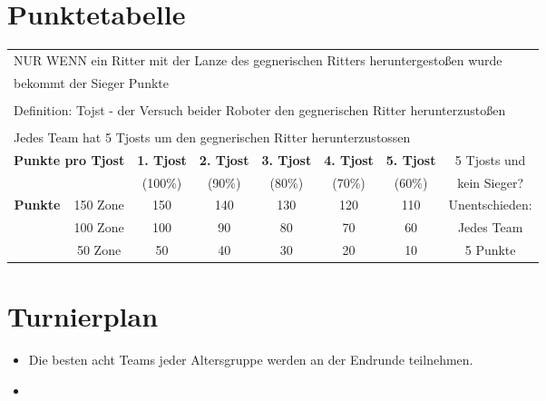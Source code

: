 \documentclass[a4paper,12pt]{article}
\begin{document}
\section{Punktetabelle}
\begin{center}
\begin{tabular}{|c|c|c|c|c|c|c|c|} \hline
	\multicolumn{8}{|l|}{NUR WENN ein Ritter mit der Lanze des gegnerischen Ritters heruntergestoßen wurde}\\
	\multicolumn{8}{|l|}{bekommt der Sieger Punkte}\\
	\multicolumn{8}{|l|}{}\\
	\multicolumn{8}{|l|}{Definition: Tojst - der Versuch beider Roboter den gegnerischen Ritter herunterzustoßen}\\
	\multicolumn{8}{|l|}{}\\
	\multicolumn{8}{|l|}{Jedes Team hat 5 Tjosts um den gegnerischen Ritter herunterzustossen} \\ \hline
	\multicolumn{2}{|c|}{\multirow{2}{*}{\textbf{Punkte pro Tjost}}} & \textbf{1. Tjost} & \textbf{2. Tjost} & \textbf{3. Tjost} & \textbf{4. Tjost} & \textbf{5. Tjost} & 5 Tjosts und \\
	\multicolumn{2}{|c|}{}  & (100\%) & (90\%) & (80\%) & (70\%) & (60\%) & kein Sieger? \\
	\cline{1-7}
	\multirow{3}{*}{\textbf{Punkte}} & 150 Zone & 150 & 140 & 130 & 120 & 110 & Unentschieden: \\
	\cline{2-7}
	& 100 Zone & 100 & 90 & 80 & 70 & 60 & Jedes Team \\
	\cline{2-7}
	& 50  Zone& 50 & 40 & 30 & 20 & 10 & 5 Punkte \\
	\hline
\end{tabular}
\end{center}

\pagebreak
\section{Turnierplan}
\begin{itemize}
	\item Die besten acht Teams jeder Altersgruppe werden an der Endrunde
		teilnehmen.
        \item \tournamentQualification
\end{itemize}
\tournamentScoring
\combinedTournament
\end{document}
